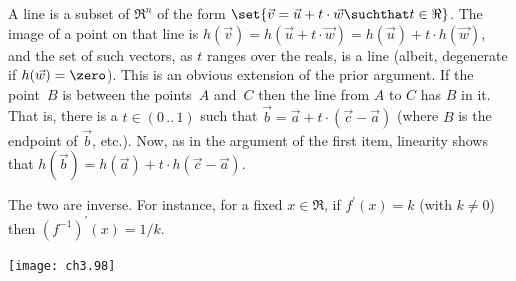 \begin{ans}{6}
      \begin{exparts}
        \partsitem A line is a subset of $\Re^n$ of the form
          $\set{\vec{v}=\vec{u}+t\cdot\vec{w}\suchthat t\in\Re}$.
          The image of a point on that line is
          $h(\vec{v})=h(\vec{u}+t\cdot\vec{w})=h(\vec{u})+t\cdot h(\vec{w})$,
          and the set of such vectors, as $t$ ranges over the reals, is
          a line (albeit, degenerate if $h(\vec{w})=\zero$).
        \partsitem This is an obvious extension of the prior argument.
        \partsitem If the point~$B$ is between the points~$A$ and~$C$ then the
          line from $A$ to $C$ has $B$ in it.
          That is, there is a $t\in (0\,..\,1)$ such that
          $\vec{b}=\vec{a}+t\cdot (\vec{c}-\vec{a})$ (where $B$ is the
          endpoint of $\vec{b}$, etc.).
          Now, as in the argument of the first item, linearity shows that
          $h(\vec{b})=h(\vec{a})+t\cdot h(\vec{c}-\vec{a})$.
      \end{exparts}
    
\end{ans}
\begin{ans}{7}
      The two are inverse.
      For instance, for a fixed $x\in\Re$,
      if $f^\prime (x)=k$ (with $k\neq 0$) then
      $(f^{-1})^\prime (x)=1/k$.
      \begin{center}
        \texttt{[image: ch3.98]}
     \end{center}
    
\end{ans}
